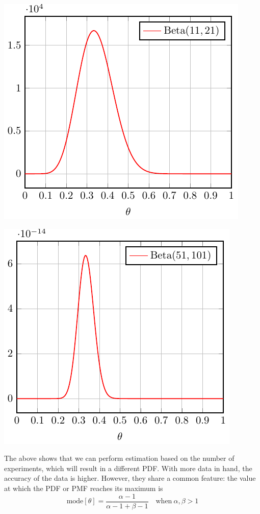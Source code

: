 \begin{minipage}{0.5\textwidth}
  \includegraphics{Figures/Beta_11_21.pdf}
\end{minipage}
\begin{minipage}{0.5\textwidth}
  \includegraphics{Figures/Beta_51_101.pdf}
\end{minipage}

The above shows that we can perform estimation based on the number of experiments, which will result in a different PDF. With more data in hand, the accuracy of the data is higher. However, they share a common feature: the value at which the PDF or PMF reaches its maximum is 
\[
  \text{mode}[\theta] = \dfrac{\alpha - 1}{\alpha - 1 + \beta - 1} \quad \text{when}\ \alpha, \beta > 1
\] 


